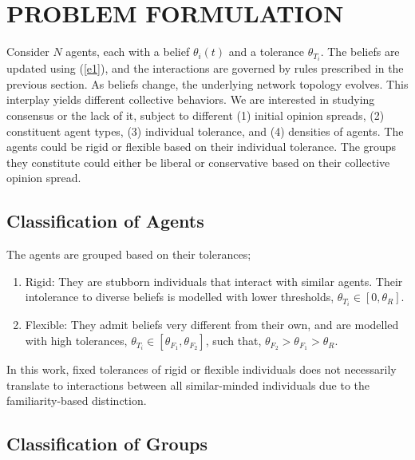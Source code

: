 \documentclass[letterpaper,english,11pt]{article}
\begin{document}
\section{PROBLEM FORMULATION}
Consider $N$ agents, each with a belief $\theta_{i}(t)$ and a tolerance $ \theta_{T_{i}}$. The beliefs are updated using (\ref{e1}), and the interactions are governed by rules prescribed in the previous section. As beliefs change, the underlying network topology evolves. This interplay yields different collective behaviors. We are interested in studying consensus or the lack of it, subject to different (1) initial opinion spreads, (2) constituent agent types, (3) individual tolerance, and (4) densities of agents. The agents could be rigid or flexible based on their individual tolerance. The groups they constitute could either be liberal or conservative based on their collective opinion spread. 

\subsection{Classification of Agents}
The agents are grouped based on their tolerances;
\begin{enumerate}
	\item{Rigid:} They are stubborn individuals that interact with similar agents. Their intolerance to diverse beliefs is modelled with lower thresholds, $\theta_{T_{i}}\in[0,\theta_{R}]$.
	
	\item{Flexible:} They admit beliefs very different from their own, and are modelled with high tolerances, $\theta_{T_{i}}\in[\theta_{F_{1}},\theta_{F_{2}}]$, such that, $\theta_{F_{2}}>\theta_{F_{1}}>\theta_{R}$.  
\end{enumerate}
In this work, fixed tolerances of rigid or flexible individuals does not necessarily translate to interactions between all similar-minded individuals due to the familiarity-based distinction. 


\subsection{Classification of Groups}
\end{document}
